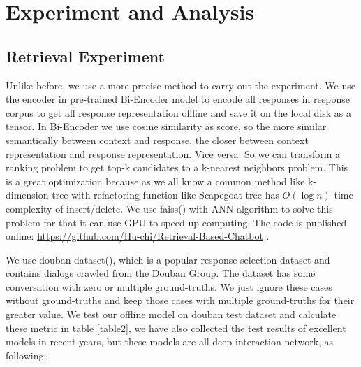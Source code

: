\documentclass{article}
\begin{document}
\section{Experiment and Analysis}

\subsection{Retrieval Experiment}

Unlike before, we use a more precise method to carry out the experiment. We use the encoder in pre-trained Bi-Encoder model to encode all responses in response corpus to get all response representation offline and save it on the local disk as a tensor. In Bi-Encoder we use cosine similarity as score, so the more similar semantically between context and response, the closer between context representation and response representation. Vice versa. So we can transform a ranking problem to get top-k candidates to a k-nearest neighbors problem. This is a great optimization because as we all know a common method like k-dimension tree with refactoring function like Scapegoat tree has $O(\log n)$ time complexity of insert/delete. We use faiss(\cite{johnson2019billion}) with ANN algorithm to solve this problem for that it can use GPU to speed up computing. The code is published online: \url{https://github.com/Hu-chi/Retrieval-Based-Chatbot} \space .

We use douban dataset(\cite{wu2016sequential}), which is a popular response selection dataset and contains dialogs crawled from the Douban Group. The dataset has some conversation with zero or multiple ground-truths. We just ignore these cases without ground-truths and keep those cases with multiple ground-truths for their greater value. We test our offline model on douban test dataset and calculate these metric in table \ref{table2}, we have also collected the test results of excellent models in recent years, but these models are all deep interaction network, as following:
\end{document}
